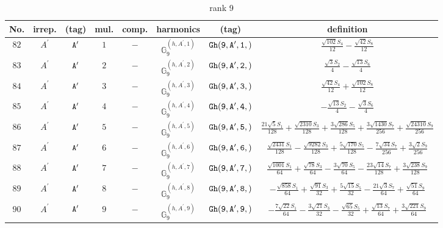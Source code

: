 \documentclass[fleqn,8pt]{jsarticle}
\begin{document}
\begin{table}[ht!]
\begin{center}
\caption{rank 9}
\renewcommand{\arraystretch}{1.3}
\begin{tabular}{cccccccc} \hline \hline
No. & irrep. & (tag) & mul. & comp. & harmonics & (tag) & definition \\ \hline
$ 82 $ & $ A^{\prime} $ & $ {\tt A'} $ & $ 1 $ & $ - $ & $ \mathbb{G}_{9}^{(h,A^{\prime},1)} $ & $ {\tt Gh(9,A',1,)} $ & $ \frac{\sqrt{102} S_{4}}{12} - \frac{\sqrt{42} S_{8}}{12} $ \\
$ 83 $ & $ A^{\prime} $ & $ {\tt A'} $ & $ 2 $ & $ - $ & $ \mathbb{G}_{9}^{(h,A^{\prime},2)} $ & $ {\tt Gh(9,A',2,)} $ & $ \frac{\sqrt{3} S_{2}}{4} - \frac{\sqrt{13} S_{6}}{4} $ \\
$ 84 $ & $ A^{\prime} $ & $ {\tt A'} $ & $ 3 $ & $ - $ & $ \mathbb{G}_{9}^{(h,A^{\prime},3)} $ & $ {\tt Gh(9,A',3,)} $ & $ \frac{\sqrt{42} S_{4}}{12} + \frac{\sqrt{102} S_{8}}{12} $ \\
$ 85 $ & $ A^{\prime} $ & $ {\tt A'} $ & $ 4 $ & $ - $ & $ \mathbb{G}_{9}^{(h,A^{\prime},4)} $ & $ {\tt Gh(9,A',4,)} $ & $ - \frac{\sqrt{13} S_{2}}{4} - \frac{\sqrt{3} S_{6}}{4} $ \\
$ 86 $ & $ A^{\prime} $ & $ {\tt A'} $ & $ 5 $ & $ - $ & $ \mathbb{G}_{9}^{(h,A^{\prime},5)} $ & $ {\tt Gh(9,A',5,)} $ & $ \frac{21 \sqrt{5} S_{1}}{128} + \frac{\sqrt{2310} S_{3}}{128} + \frac{3 \sqrt{286} S_{5}}{128} + \frac{3 \sqrt{1430} S_{7}}{256} + \frac{\sqrt{24310} S_{9}}{256} $ \\
$ 87 $ & $ A^{\prime} $ & $ {\tt A'} $ & $ 6 $ & $ - $ & $ \mathbb{G}_{9}^{(h,A^{\prime},6)} $ & $ {\tt Gh(9,A',6,)} $ & $ \frac{\sqrt{2431} S_{1}}{128} - \frac{\sqrt{9282} S_{3}}{128} + \frac{5 \sqrt{170} S_{5}}{128} - \frac{7 \sqrt{34} S_{7}}{256} + \frac{3 \sqrt{2} S_{9}}{256} $ \\
$ 88 $ & $ A^{\prime} $ & $ {\tt A'} $ & $ 7 $ & $ - $ & $ \mathbb{G}_{9}^{(h,A^{\prime},7)} $ & $ {\tt Gh(9,A',7,)} $ & $ \frac{\sqrt{1001} S_{1}}{64} + \frac{\sqrt{78} S_{3}}{64} - \frac{3 \sqrt{70} S_{5}}{64} - \frac{23 \sqrt{14} S_{7}}{128} + \frac{3 \sqrt{238} S_{9}}{128} $ \\
$ 89 $ & $ A^{\prime} $ & $ {\tt A'} $ & $ 8 $ & $ - $ & $ \mathbb{G}_{9}^{(h,A^{\prime},8)} $ & $ {\tt Gh(9,A',8,)} $ & $ - \frac{\sqrt{858} S_{1}}{64} + \frac{\sqrt{91} S_{3}}{32} + \frac{5 \sqrt{15} S_{5}}{32} - \frac{21 \sqrt{3} S_{7}}{64} + \frac{\sqrt{51} S_{9}}{64} $ \\
$ 90 $ & $ A^{\prime} $ & $ {\tt A'} $ & $ 9 $ & $ - $ & $ \mathbb{G}_{9}^{(h,A^{\prime},9)} $ & $ {\tt Gh(9,A',9,)} $ & $ - \frac{7 \sqrt{22} S_{1}}{64} - \frac{3 \sqrt{21} S_{3}}{32} - \frac{\sqrt{65} S_{5}}{32} + \frac{\sqrt{13} S_{7}}{64} + \frac{3 \sqrt{221} S_{9}}{64} $ \\

\end{tabular}
\end{center}
\end{table}
\end{document}
